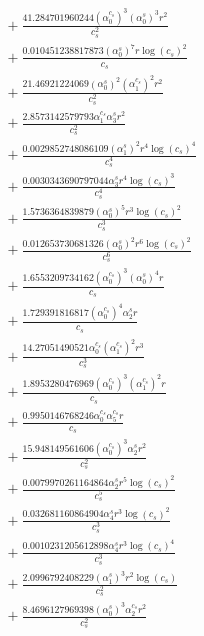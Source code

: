 \documentclass[10pt]{article}
\begin{document}
\begin{align*}
&{}  + \frac{41.284701960244 \left(\alpha_{0}^{c_s}\right)^{3} \left(\alpha_{0}^s\right)^{3} r^{2}}{c_{s}^{2}} \\
&{}  + \frac{0.010451238817873 \left(\alpha_{0}^s\right)^{7} r \log{\left(c_{s} \right)}^{2}}{c_{s}} \\
&{}  + \frac{21.46921224069 \left(\alpha_{0}^s\right)^{2} \left(\alpha_{1}^{c_s}\right)^{2} r^{2}}{c_{s}^{2}} \\
&{}  + \frac{2.8573142579793 \alpha_{1}^{c_s} \alpha_{3}^s r^{2}}{c_{s}^{2}} \\
&{}  + \frac{0.0029852748086109 \left(\alpha_{1}^s\right)^{2} r^{4} \log{\left(c_{s} \right)}^{4}}{c_{s}^{4}} \\
&{}  + \frac{0.0030343690797044 \alpha_{3}^s r^{4} \log{\left(c_{s} \right)}^{3}}{c_{s}^{4}} \\
&{}  + \frac{1.5736364839879 \left(\alpha_{0}^s\right)^{5} r^{3} \log{\left(c_{s} \right)}^{2}}{c_{s}^{3}} \\
&{}  + \frac{0.012653730681326 \left(\alpha_{0}^s\right)^{2} r^{6} \log{\left(c_{s} \right)}^{2}}{c_{s}^{6}} \\
&{}  + \frac{1.6553209734162 \left(\alpha_{0}^{c_s}\right)^{3} \left(\alpha_{0}^s\right)^{4} r}{c_{s}} \\
&{}  + \frac{1.729391816817 \left(\alpha_{0}^{c_s}\right)^{4} \alpha_{2}^s r}{c_{s}} \\
&{}  + \frac{14.27051490521 \alpha_{0}^{c_s} \left(\alpha_{1}^{c_s}\right)^{2} r^{3}}{c_{s}^{3}} \\
&{}  + \frac{1.8953280476969 \left(\alpha_{0}^{c_s}\right)^{3} \left(\alpha_{1}^{c_s}\right)^{2} r}{c_{s}} \\
&{}  + \frac{0.9950146768246 \alpha_{0}^{c_s} \alpha_{5}^{c_s} r}{c_{s}} \\
&{}  + \frac{15.948149561606 \left(\alpha_{0}^{c_s}\right)^{3} \alpha_{2}^s r^{2}}{c_{s}^{2}} \\
&{}  + \frac{0.0079970261164864 \alpha_{2}^s r^{5} \log{\left(c_{s} \right)}^{2}}{c_{s}^{5}} \\
&{}  + \frac{0.032681160864904 \alpha_{4}^s r^{3} \log{\left(c_{s} \right)}^{2}}{c_{s}^{3}} \\
&{}  + \frac{0.0010231205612898 \alpha_{4}^s r^{3} \log{\left(c_{s} \right)}^{4}}{c_{s}^{3}} \\
&{}  + \frac{2.0996792408229 \left(\alpha_{1}^s\right)^{3} r^{2} \log{\left(c_{s} \right)}}{c_{s}^{2}} \\
&{}  + \frac{8.4696127969398 \left(\alpha_{0}^s\right)^{3} \alpha_{2}^{c_s} r^{2}}{c_{s}^{2}} \\

\end{align*}
\end{document}
